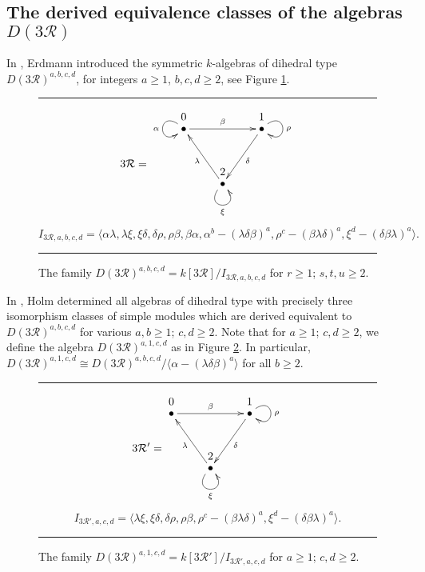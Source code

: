 \documentclass{amsart}
\theoremstyle{plain}
\theoremstyle{definition}
\theoremstyle{remark}
\begin{document}
\subsection{The derived equivalence classes of the algebras $D(3\mathcal{R})$}
\label{s:family}

In \cite{erd}, Erdmann introduced the symmetric $k$-algebras of dihedral type
$D(3\mathcal{R})^{a,b,c,d}$, for integers $a\ge 1$, $b,c,d\ge 2$, see Figure \ref{fig:algebra3R}.
\begin{figure}[ht] \hrule \caption{\label{fig:algebra3R} The family $D(3\mathcal{R})^{a,b,c,d}=k[3\mathcal{R}]/I_{3\mathcal{R},a,b,c,d}$
for $r\ge 1$; $s,t,u\ge 2$.}
$$3\mathcal{R}=\vcenter{\xymatrix @R=-.1pc {
0&&1\\
\ar@(ul,dl)_{\alpha} \bullet \ar[rr]^{\beta}  &&\bullet\ar[ldddddddd]^{\delta} \ar@(ur,dr)^{\rho} 
\\&&\\&&\\&&\\&&\\&&\\&&\\&2&\\ 
&
\bullet\ar[uuuuuuuul]^{\lambda}
\ar@(ld,rd)_{\xi} & }}$$
$$I_{3\mathcal{R},a,b,c,d}=\langle \alpha\lambda,\lambda\xi,
\xi\delta,\delta\rho,\rho\beta,\beta\alpha,
\alpha^b-(\lambda\delta\beta)^a,\rho^c-(\beta\lambda\delta)^a,\xi^d-(\delta\beta\lambda)^a\rangle.$$
\vspace{1ex}
\hrule
\end{figure}

In \cite[Sect. 3.2]{holm}, Holm determined all algebras of dihedral type with precisely three isomorphism
classes of simple modules which are derived equivalent to $D(3\mathcal{R})^{a,b,c,d}$ for various $a,b\ge  1$; $c,d\ge 2$. 
Note that for $a\ge 1$; $c,d\ge 2$, we define the algebra $D(3\mathcal{R})^{a,1,c,d}$ as in Figure \ref{fig:algebra3R'}.
In particular, $D(3\mathcal{R})^{a,1,c,d}\cong D(3\mathcal{R})^{a,b,c,d}/\langle \alpha - (\lambda\delta\beta)^a\rangle$ for all $b\ge 2$.
\begin{figure}[ht] \hrule \caption{\label{fig:algebra3R'} The family $D(3\mathcal{R})^{a,1,c,d}=k[3\mathcal{R'}]/I_{3\mathcal{R}',a,c,d}$
for $a\ge 1$; $c,d\ge 2$.}
$$3\mathcal{R}'=\vcenter{\xymatrix @R=-.1pc {
0&&1\\
\bullet \ar[rr]^{\beta}  &&\bullet\ar[ldddddddd]^{\delta} \ar@(ur,dr)^{\rho} 
\\&&\\&&\\&&\\&&\\&&\\&&\\&2&\\ 
&
\bullet\ar[uuuuuuuul]^{\lambda}
\ar@(ld,rd)_{\xi} & }}$$
$$I_{3\mathcal{R}',a,c,d}= \langle \lambda\xi,\xi\delta,\delta\rho,\rho\beta,
\rho^c-(\beta\lambda\delta)^a,\xi^d-(\delta\beta\lambda)^a\rangle.$$
\vspace{1ex}
\hrule
\end{figure}
\end{document}
